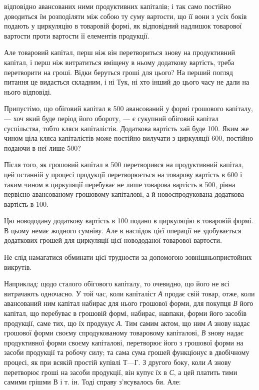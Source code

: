 \parcont{}  %
відповідно авансованих ними продуктивних капіталів; і так само постійно
доводиться їм розподіляти між собою ту суму вартости, що її вони
з усіх боків подають у циркуляцію в товаровій формі, як відповідний
надлишок товарової вартости проти вартости її елементів продукції.

Але товаровий капітал, перш ніж він перетвориться знову на продуктивний
капітал, і перш ніж витратиться вміщену в ньому додаткову
вартість, треба перетворити на гроші. Відки беруться гроші для цього?
На перший погляд питання це видається складним, і ні Тук, ні хто інший
до цього часу не дали на нього відповіді.

Припустімо, що обіговий капітал в 500 авансований у формі
грошового капіталу, — хоч який буде період його обороту, — є сукупний
обіговий капітал суспільства, тобто кляси капіталістів. Додаткова вартість
хай буде 100. Яким же чином ціла кляса капіталістів може постійно
вилучати з циркуляції 600, постійно подаючи в неї
лише 500?

Після того, як грошовий капітал в 500 перетворився на
продуктивний капітал, цей останній у процесі продукції перетворюється
на товарову вартість в 600 і таким чином в циркуляції перебуває
не лише товарова вартість в 500, рівна первісно авансованому
грошовому капіталові, а й новоспродукована додаткова
вартість в 100.

Цю новододану додаткову вартість в 100 подано в циркуляцію
в товаровій формі. В цьому немає жодного сумніву. Але в наслідок
цієї операції не здобувається додаткових грошей для циркуляції
цієї новододаної товарової вартости.

Не слід намагатися обминати цієї трудности за допомогою зовнішньопристойних
викрутів.

Наприклад: щодо сталого обігового капіталу, то очевидно, що його
не всі витрачають одночасно. У той час, коли капіталіст \emph{А} продає
свій товар, отже, коли авансований ним капітал набирає для нього грошової
форми, для покупця \emph{В} його капітал, що перебуває в грошовій
формі, набирає, навпаки, форми його засобів продукції, саме тих, що їх
продукує \emph{А}. Тим самим актом, що ним \emph{А} знову надає грошової форми
своєму спродукованому товаровому капіталові, \emph{В} знову надає продуктивної
форми своєму капіталові, перетворює його з грошової форми на засоби
продукції та робочу силу; та сама сума грошей функціонує в двобічному
процесі, як при всякій простій купівлі $Т — Г$. З другого боку, коли
\emph{А} знову перетворює гроші на засоби продукції, він купує їх в \emph{С}, а
цей платить тими самими грішми В і т. ін. Тоді справу з’ясувалось би. Але:

